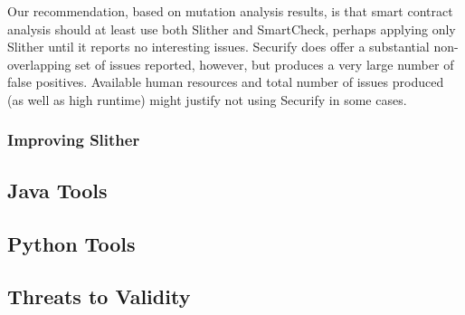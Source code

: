 Our recommendation, based on mutation analysis results, is that smart contract analysis should at least use both Slither and SmartCheck, perhaps applying only Slither until it reports no interesting issues.  Securify does offer a substantial non-overlapping set of issues reported, however, but produces a very large number of false positives.  Available human resources and total number of issues produced (as well as high runtime) might justify not using Securify in some cases.

\subsubsection{Improving Slither}

\subsection{Java Tools}

\subsection{Python Tools}

\subsection{Threats to Validity}